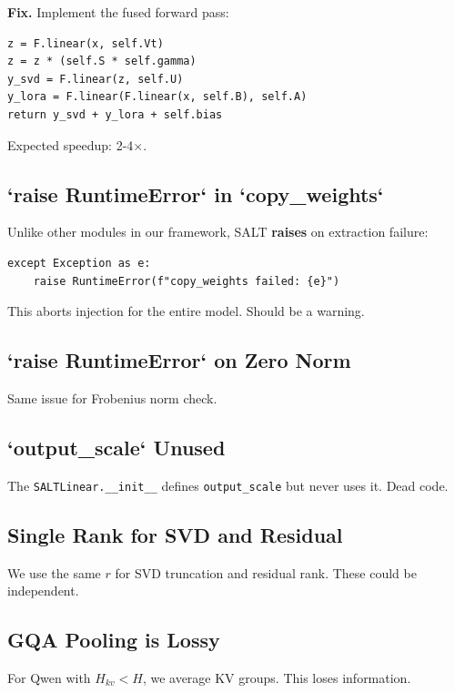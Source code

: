 \textbf{Fix.} Implement the fused forward pass:

\begin{lstlisting}
z = F.linear(x, self.Vt)
z = z * (self.S * self.gamma)
y_svd = F.linear(z, self.U)
y_lora = F.linear(F.linear(x, self.B), self.A)
return y_svd + y_lora + self.bias
\end{lstlisting}

Expected speedup: 2-4$\times$.

\subsection{`raise RuntimeError` in `copy\_weights`}

Unlike other modules in our framework, SALT \textbf{raises} on extraction failure:

\begin{lstlisting}
except Exception as e:
    raise RuntimeError(f"copy_weights failed: {e}")
\end{lstlisting}

This aborts injection for the entire model. Should be a warning.

\subsection{`raise RuntimeError` on Zero Norm}

Same issue for Frobenius norm check.

\subsection{`output\_scale` Unused}

The \texttt{SALTLinear.\_\_init\_\_} defines \texttt{output\_scale} but never uses it. Dead code.

\subsection{Single Rank for SVD and Residual}

We use the same $r$ for SVD truncation and residual rank. These could be 
independent.

\subsection{GQA Pooling is Lossy}

For Qwen with $H_{kv} < H$, we average KV groups. This loses information.

